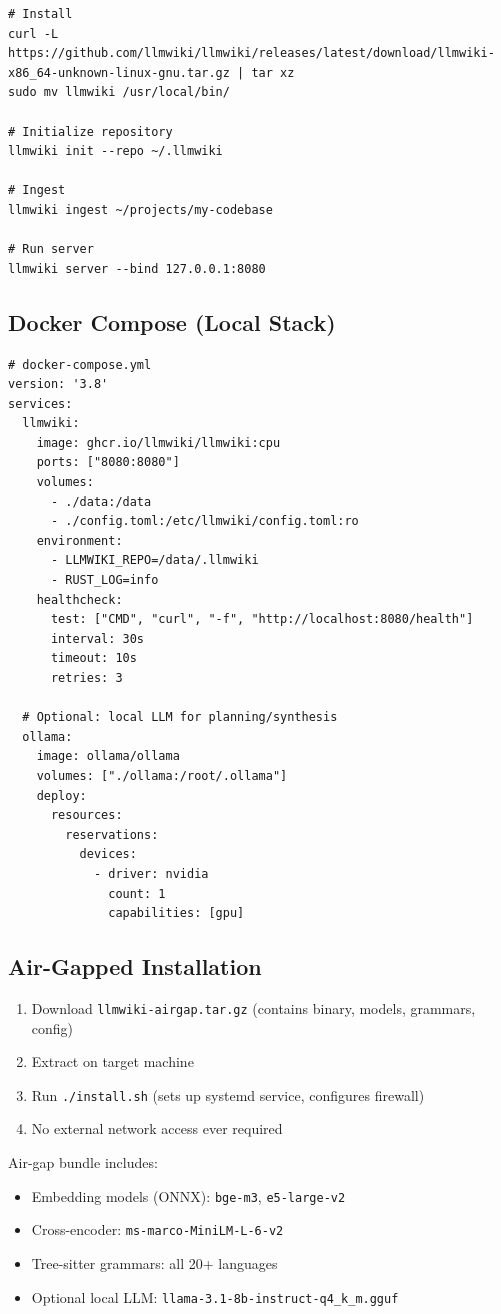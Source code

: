 \begin{verbatim}
# Install
curl -L https://github.com/llmwiki/llmwiki/releases/latest/download/llmwiki-x86_64-unknown-linux-gnu.tar.gz | tar xz
sudo mv llmwiki /usr/local/bin/

# Initialize repository
llmwiki init --repo ~/.llmwiki

# Ingest
llmwiki ingest ~/projects/my-codebase

# Run server
llmwiki server --bind 127.0.0.1:8080
\end{verbatim}

\subsection{Docker Compose (Local Stack)}
\label{sec:deploy:compose}

\begin{verbatim}
# docker-compose.yml
version: '3.8'
services:
  llmwiki:
    image: ghcr.io/llmwiki/llmwiki:cpu
    ports: ["8080:8080"]
    volumes:
      - ./data:/data
      - ./config.toml:/etc/llmwiki/config.toml:ro
    environment:
      - LLMWIKI_REPO=/data/.llmwiki
      - RUST_LOG=info
    healthcheck:
      test: ["CMD", "curl", "-f", "http://localhost:8080/health"]
      interval: 30s
      timeout: 10s
      retries: 3

  # Optional: local LLM for planning/synthesis
  ollama:
    image: ollama/ollama
    volumes: ["./ollama:/root/.ollama"]
    deploy:
      resources:
        reservations:
          devices:
            - driver: nvidia
              count: 1
              capabilities: [gpu]
\end{verbatim}

\subsection{Air-Gapped Installation}
\label{sec:deploy:airgap}

\begin{enumerate}
  \item Download \texttt{llmwiki-airgap.tar.gz} (contains binary, models, grammars, config)
  \item Extract on target machine
  \item Run \texttt{./install.sh} (sets up systemd service, configures firewall)
  \item No external network access ever required
\end{enumerate}

Air-gap bundle includes:
\begin{itemize}
  \item Embedding models (ONNX): \texttt{bge-m3}, \texttt{e5-large-v2}
  \item Cross-encoder: \texttt{ms-marco-MiniLM-L-6-v2}
  \item Tree-sitter grammars: all 20+ languages
  \item Optional local LLM: \texttt{llama-3.1-8b-instruct-q4\_k\_m.gguf}
\end{itemize}


